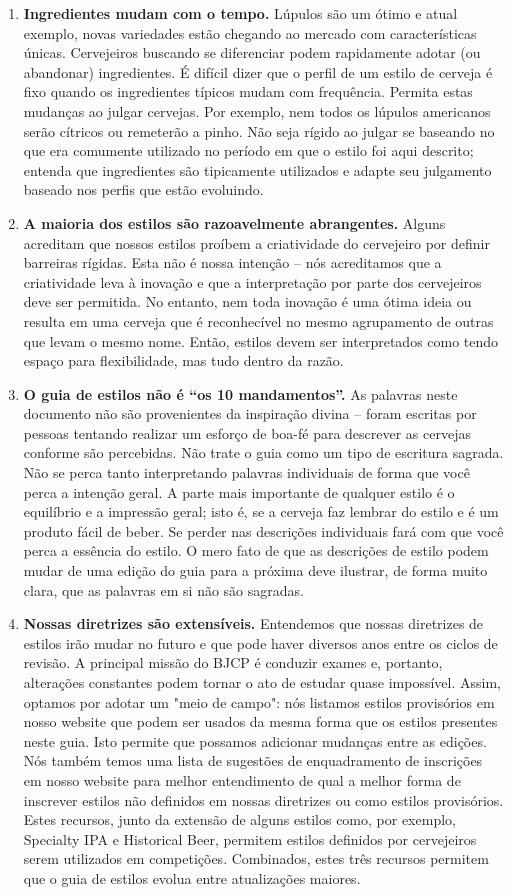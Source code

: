 \begin{enumerate}
\item \textbf{Ingredientes mudam com o tempo.} Lúpulos são um ótimo e atual exemplo, novas variedades estão chegando ao mercado com características únicas. Cervejeiros buscando se diferenciar podem rapidamente adotar (ou abandonar) ingredientes. É difícil dizer que o perfil de um estilo de cerveja é fixo quando os ingredientes típicos mudam com frequência. Permita estas mudanças ao julgar cervejas. Por exemplo, nem todos os lúpulos americanos serão cítricos ou remeterão a pinho. Não seja rígido ao julgar se baseando no que era comumente utilizado no período em que o estilo foi aqui descrito; entenda que ingredientes são tipicamente utilizados e adapte seu julgamento baseado nos perfis que estão evoluindo.
\item \textbf{A maioria dos estilos são razoavelmente abrangentes.} Alguns acreditam que nossos estilos proíbem a criatividade do cervejeiro por definir barreiras rígidas. Esta não é nossa intenção – nós acreditamos que a criatividade leva à inovação e que a interpretação por parte dos cervejeiros deve ser permitida. No entanto, nem toda inovação é uma ótima ideia ou resulta em uma cerveja que é reconhecível no mesmo agrupamento de outras que levam o mesmo nome. Então, estilos devem ser interpretados como tendo espaço para flexibilidade, mas tudo dentro da razão.
\item \textbf{O guia de estilos não é “os 10 mandamentos”.} As palavras neste documento não são provenientes da inspiração divina – foram escritas por pessoas tentando realizar um esforço de boa-fé para descrever as cervejas conforme são percebidas. Não trate o guia como um tipo de escritura sagrada. Não se perca tanto interpretando palavras individuais de forma que você perca a intenção geral. A parte mais importante de qualquer estilo é o equilíbrio e a impressão geral; isto é, se a cerveja faz lembrar do estilo e é um produto fácil de beber. Se perder nas descrições individuais fará com que você perca a essência do estilo. O mero fato de que as descrições de estilo podem mudar de uma edição do guia para a próxima deve ilustrar, de forma muito clara, que as palavras em si não são sagradas.
\item \textbf{Nossas diretrizes são extensíveis.} Entendemos que nossas diretrizes de estilos irão mudar no futuro e que pode haver diversos anos entre os ciclos de revisão. A principal missão do BJCP é conduzir exames e, portanto, alterações constantes podem tornar o ato de estudar quase impossível. Assim, optamos por adotar um "meio de campo": nós listamos estilos provisórios em nosso website que podem ser usados da mesma forma que os estilos presentes neste guia. Isto permite que possamos adicionar mudanças entre as edições. Nós também temos uma lista de sugestões de enquadramento de inscrições em nosso website para melhor entendimento de qual a melhor forma de inscrever estilos não definidos em nossas diretrizes ou como estilos provisórios. Estes recursos, junto da extensão de alguns estilos como, por exemplo, Specialty IPA e Historical Beer, permitem estilos definidos por cervejeiros serem utilizados em competições. Combinados, estes três recursos permitem que o guia de estilos evolua entre atualizações maiores.

\end{enumerate}
